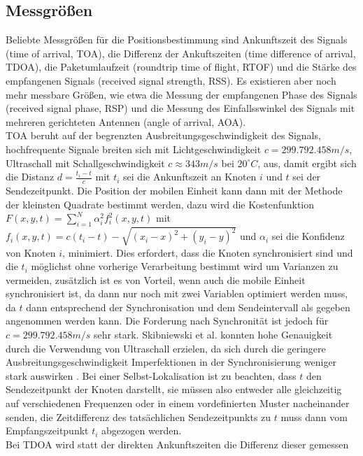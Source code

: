 \subsection{Messgrößen}
Beliebte Messgrößen für die Positionsbestimmung sind Ankunftszeit des Signals (time of arrival, TOA), die Differenz der Ankuftszeiten (time difference of arrival, TDOA), die Paketumlaufzeit (roundtrip time of flight, RTOF) und die Stärke des empfangenen Signals (received signal strength, RSS). Es existieren aber noch mehr messbare Größen, wie etwa die Messung der empfangenen Phase des Signals (received signal phase, RSP) und die Messung des Einfallsswinkel des Signals mit mehreren gerichteten Antennen (angle of arrival, AOA). \\
TOA beruht auf der begrenzten Ausbreitungsgeschwindigkeit des Signals, hochfrequente Signale breiten sich mit Lichtgeschwindigkeit $c = 299.792.458m/s$, Ultraschall mit Schallgeschwindigkeit $c \approx 343m/s$ bei $20^{\circ}C$, aus, damit ergibt sich die Distanz $d = \frac{t_i - t}{c}$ mit $t_i$ sei die Ankunftszeit an Knoten $i$ und $t$ sei der Sendezeitpunkt. Die Position der mobilen Einheit kann dann mit der Methode der kleinsten Quadrate bestimmt werden, dazu wird die Kostenfunktion $F(x,y,t) = \sum_{i=1}^{N} {\alpha}^2_i f^2_i(x,y,t)$ mit $f_i(x,y,t) = c(t_i - t) - \sqrt{(x_i - x)^2 + (y_i - y)^2}$ und ${\alpha}_i$ sei die Konfidenz von Knoten $i$, minimiert. Dies erfordert, dass die Knoten synchronisiert sind und die $t_i$ möglichst ohne vorherige Verarbeitung bestimmt wird um Varianzen zu vermeiden, zusätzlich ist es von Vorteil, wenn auch die mobile Einheit synchronisiert ist, da dann nur noch mit zwei Variablen optimiert werden muss, da $t$ dann entsprechend der Synchronisation und dem Sendeintervall als gegeben angenommen werden kann. Die Forderung nach Synchronität ist jedoch für $c = 299.792.458m/s$ sehr stark. Skibniewski et al. konnten hohe Genauigkeit durch die Verwendung von Ultraschall erzielen, da sich durch die geringere Ausbreitungsgeschwindigkeit Imperfektionen in der Synchronisierung weniger stark auswirken \cite{skibniewski2009simulation}. 
Bei einer Selbst-Lokalisation ist zu beachten, dass $t$ den Sendezeitpunkt der Knoten darstellt, sie müssen also entweder alle gleichzeitig auf verschiedenen Frequenzen oder in einem vordefinierten Muster nacheinander senden, die Zeitdifferenz des tatsächlichen Sendezeitpunkts zu $t$ muss dann vom Empfangszeitpunkt $t_i$ abgezogen werden. \\
Bei TDOA wird statt der direkten Ankunftszeiten die Differenz dieser gemessen


